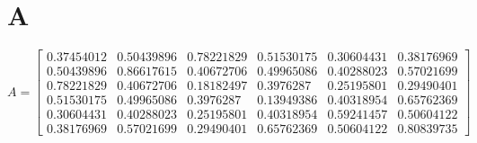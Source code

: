 \onecolumn
\setcounter{equation}{0}
\renewcommand\theequation{A.\arabic{equation}}
\section*{A}
\label{sec:appendix}

\begin{equation*}
A = \begin{bmatrix}
0.37454012 & 0.50439896 & 0.78221829 & 0.51530175 & 0.30604431 & 0.38176969 \\
0.50439896 & 0.86617615 & 0.40672706 & 0.49965086 & 0.40288023 & 0.57021699 \\
0.78221829 & 0.40672706 & 0.18182497 & 0.3976287  & 0.25195801 & 0.29490401 \\
0.51530175 & 0.49965086 & 0.3976287  & 0.13949386 & 0.40318954 & 0.65762369 \\
0.30604431 & 0.40288023 & 0.25195801 & 0.40318954 & 0.59241457 & 0.50604122 \\
0.38176969 & 0.57021699 & 0.29490401 & 0.65762369 & 0.50604122 & 0.80839735 
\end{bmatrix}
\end{equation*}

